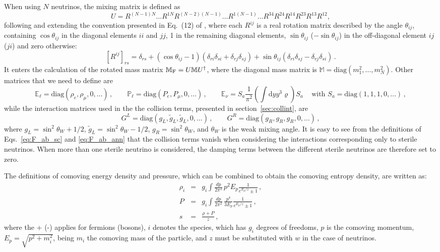 \documentclass[notitlepage,showpacs,preprintnumbers,amsmath,amssymb,superscriptaddress,prd,onecolumn]{revtex4-1}
\begin{document}
When using $N$ neutrinos,
the mixing matrix is defined as
%
\begin{equation}\label{eq:mixing_matrix_nxn}
U=R^{(N-1)N} \ldots R^{1N}
R^{(N-2)(N-1)}\ldots R^{1(N-1)}
\ldots
R^{34} R^{24} R^{14} R^{23} R^{13} R^{12},
\end{equation}
%
following and extending the convention presented in Eq.~(12) of \cite{Gariazzo:2015rra},
where each $R^{ij}$ is a real rotation matrix described by the angle $\theta_{ij}$,
containing $\cos\theta_{ij}$ in the diagonal elements $ii$ and $jj$,
1 in the remaining diagonal elements,
$\sin\theta_{ij}$ ($-\sin\theta_{ij}$) in the off-diagonal element $ij$ ($ji$)
and zero otherwise:
\begin{equation}
\label{eq:rotationmatrix}
[R^{ij}]_{rs}=
\delta_{rs}
+
(\cos\theta_{ij}-1)(\delta_{ri}\delta_{si}+\delta_{rj}\delta_{sj})
+
\sin\theta_{ij}(\delta_{ri}\delta_{sj}-\delta_{rj}\delta_{si})\,.
\end{equation}
It enters the calculation of the rotated mass matrix
$\mathbb{M}_{\rm F}=U\mathbb{M}U^\dagger$,
where the diagonal mass matrix is
$\mathbb{M}=\text{diag}(m_1^2,\ldots,m_N^2)$.
Other matrices that we need to define are
%
\begin{equation}\label{eq:matterpotentials_nxn}
\mathbb{E}_\ell=\text{diag}(\rho_e, \rho_\mu, 0, \ldots)\,,
\qquad
\mathbb{P}_\ell=\text{diag}(P_e, P_\mu, 0, \ldots)\,,
\qquad
\mathbb{E}_\nu=S_a\frac{1}{\pi^2}\left(\int \mathrm{d}y y^3\varrho\right) S_a\,
\quad\mbox{with }S_a=\text{diag}(1,1,1,0,\ldots)\,,
\end{equation}
while the interaction matrices used in the the collision terms,
presented in section~\ref{sec:collint}, are
\begin{equation}
\label{eq:gLR}
G^L=\text{diag}(g_L, \tilde g_L, \tilde g_L, 0,\ldots)\,,
\qquad
G^R=\text{diag}(g_R, g_R, g_R, 0,\ldots)\,,
\end{equation}
%
where $g_L=\sin^2\theta_W+1/2$, $\tilde g_L=\sin^2\theta_W - 1/2$, $g_R=\sin^2\theta_W$,
and $\theta_W$ is the weak mixing angle.
It is easy to see from the definitions of Eqs.~\eqref{eq:F_ab_sc} and \eqref{eq:F_ab_ann}
that the collision terms vanish when considering the interactions corresponding
only to sterile neutrinos.
When more than one sterile neutrino is considered, the damping terms between the different sterile neutrinos are therefore set to zero.

The definitions of comoving energy density and pressure,
which can be combined to obtain the comoving entropy density,
are written as:
\begin{eqnarray}
\rho_i
&=&
g_i
\int\frac{dp}{2\pi^2}\,
p^2 E_p \frac{1}{e^{E_p/z}\pm1}
\,,
\\
P
&=&
g_i
\int\frac{dp}{2\pi^2}\,
\frac{p^4}{3 E_p} \frac{1}{e^{E_p/z}\pm1}
\,,
\\
s
&=&
\frac{\rho+P}{z}
\,,
\end{eqnarray}
where the + (-) applies for fermions (bosons),
$i$ denotes the species, which has $g_i$ degrees of freedoms,
$p$ is the comoving momentum,
$E_p=\sqrt{p^2 + m_i^2}$, being $m_i$ the comoving mass of the particle,
and $z$ must be substituted with $w$ in the case of neutrinos.
\end{document}
